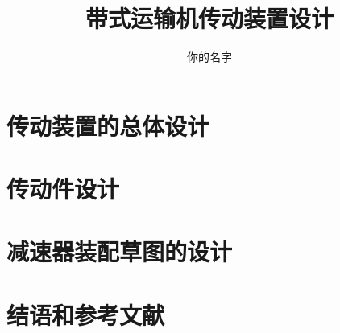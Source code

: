 \documentclass[12pt,a4paper,UTF8]{ctexart}
\author{你的名字}
\title{带式运输机传动装置设计}
\begin{document}
	
	\newpage
	\tableofcontents
	\newpage
	\section{传动装置的总体设计}
		
	\section{传动件设计}
		
	\section{减速器装配草图的设计}
		
		
		
		
	\section{结语和参考文献}
		
	\newpage
	
	
\end{document}
